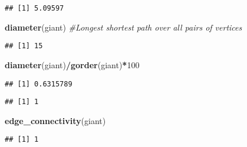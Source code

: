 \documentclass[
]{article}
\newenvironment{Shaded}{\begin{snugshade}}{\end{snugshade}}
\newcommand{\CommentTok}[1]{\textcolor[rgb]{0.56,0.35,0.01}{\textit{#1}}}
\newcommand{\DecValTok}[1]{\textcolor[rgb]{0.00,0.00,0.81}{#1}}
\newcommand{\KeywordTok}[1]{\textcolor[rgb]{0.13,0.29,0.53}{\textbf{#1}}}
\newcommand{\NormalTok}[1]{#1}
\newcommand{\OperatorTok}[1]{\textcolor[rgb]{0.81,0.36,0.00}{\textbf{#1}}}
\begin{document}
\begin{verbatim}
## [1] 5.09597
\end{verbatim}

\begin{Shaded}
\begin{Highlighting}[]
\KeywordTok{diameter}\NormalTok{(giant)        }\CommentTok{#Longest shortest path over all pairs of vertices}
\end{Highlighting}
\end{Shaded}

\begin{verbatim}
## [1] 15
\end{verbatim}

\begin{Shaded}
\begin{Highlighting}[]
\KeywordTok{diameter}\NormalTok{(giant)}\OperatorTok{/}\KeywordTok{gorder}\NormalTok{(giant)}\OperatorTok{*}\DecValTok{100}
\end{Highlighting}
\end{Shaded}

\begin{verbatim}
## [1] 0.6315789
\end{verbatim}

\begin{Shaded}
\end{Shaded}

\begin{verbatim}
## [1] 1
\end{verbatim}

\begin{Shaded}
\begin{Highlighting}[]
\KeywordTok{edge_connectivity}\NormalTok{(giant)}
\end{Highlighting}
\end{Shaded}

\begin{verbatim}
## [1] 1
\end{verbatim}
\end{document}
